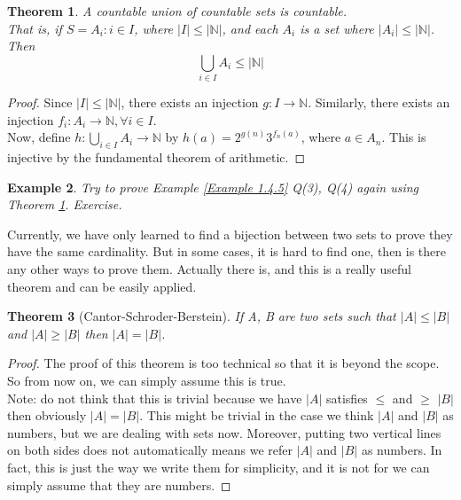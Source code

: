 \documentclass{book}
\newtheorem{theorem}{Theorem}[section]
\newtheorem{example}[theorem]{Example}
\begin{document}
\begin{theorem} \label{Theorem 1.4.6}
    A countable union of countable sets is countable. \\
    That is, if $S = A_{i} : i \in I$, where $|I| \leq |\mathbb{N}|$, and each $A_{i}$ is a set where $|A_{i}| \leq |\mathbb{N}|$. Then
    $$\bigcup_{i \in I} A_{i} \leq |\mathbb{N}|$$
\end{theorem}

\begin{proof}
    Since $|I| \leq |\mathbb{N}|$, there exists an injection $g : I \rightarrow \mathbb{N}$. Similarly, there exists an injection $f_{i} : A_{i} \rightarrow \mathbb{N}, \forall i \in I.$ \\
    Now, define $h : \bigcup_{i \in I} A_{i} \rightarrow \mathbb{N}$ by $h(a) = 2^{g(n)} 3^{f_n(a)}$, where $a \in A_{n}$. This is injective by the fundamental theorem of arithmetic.
\end{proof}

\begin{example}
    Try to prove Example \ref{Example 1.4.5} Q(3), Q(4) again using Theorem \ref{Theorem 1.4.6}. Exercise.
\end{example}

Currently, we have only learned to find a bijection between two sets to prove they have the same cardinality. But in some cases, it is hard to find one, then is there any other ways to prove them. Actually there is, and this is a really useful theorem and can be easily applied.

\begin{theorem}[Cantor-Schroder-Berstein] \label{Theorem 1.4.8}
    If A, B are two sets such that $|A| \leq |B|$ and $|A| \geq |B|$ then $|A| = |B|$.
\end{theorem}

\begin{proof}
    The proof of this theorem is too technical so that it is beyond the scope. So from now on, we can simply assume this is true. \\
    Note: do not think that this is trivial because we have $|A|$ satisfies $\leq$ and $\geq$ $|B|$ then obviously $|A| = |B|$. This might be trivial in the case we think $|A|$ and $|B|$ as numbers, but we are dealing with sets now. Moreover, putting two vertical lines on both sides does not automatically means we refer $|A|$ and $|B|$ as numbers. In fact, this is just the way we write them for simplicity, and it is not for we can simply assume that they are numbers.
\end{proof}
\end{document}
